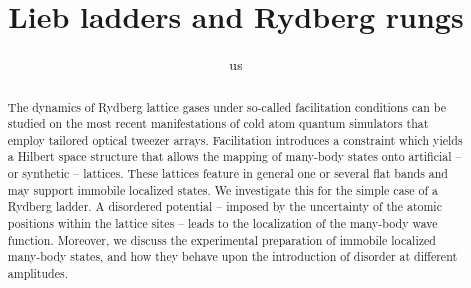 \documentclass[prl,aps,twocolumn,showpacs,superscriptaddress,longbibliography]{revtex4-1}
\begin{document}
\title{Lieb ladders and Rydberg rungs}

\author{us}



\begin{abstract}
The dynamics of Rydberg lattice gases under so-called facilitation conditions can be studied on the most recent manifestations of cold atom quantum simulators that employ tailored optical tweezer arrays. Facilitation introduces a constraint which yields a Hilbert space structure that allows the mapping of many-body states onto artificial -- or synthetic -- lattices. These lattices feature in general one or several flat bands and may support immobile localized states. We investigate this for the simple case of a Rydberg ladder. A disordered potential --  imposed by the uncertainty of the atomic positions within the lattice sites -- leads to the localization of the many-body wave function. Moreover, we discuss the experimental preparation of immobile localized many-body states, and how they behave upon the introduction of disorder at different amplitudes.
\end{abstract}
\pacs{}
\maketitle
\end{document}
